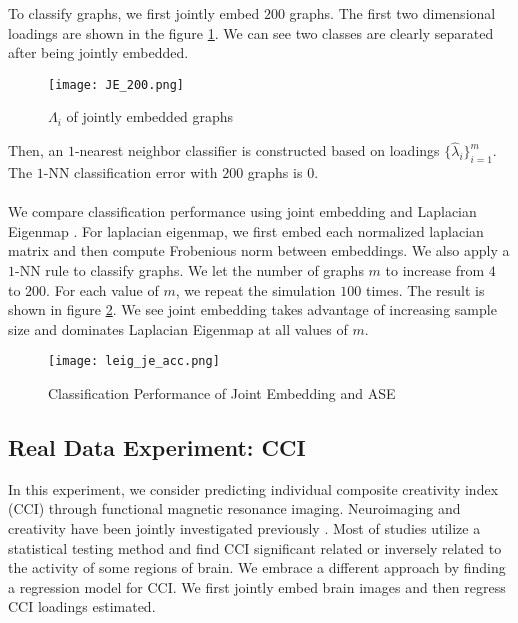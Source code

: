\documentclass[10pt,journal,compsoc]{IEEEtran}
\begin{document}
\noindent To classify graphs, we first jointly embed $200$ graphs. The first two dimensional loadings are shown in the figure \ref{fig:load}. We can see two classes are clearly separated after being jointly embedded.
\begin{figure}[!htbp]
	\centering
	\texttt{[image: JE\_200.png]}
	\caption{$\Lambda_i$ of jointly embedded graphs}
	\label{fig:load}
\end{figure}
Then, an $1$-nearest neighbor classifier is constructed based on loadings $\{\hat{\lambda}_i\}_{i=1}^m$. The $1$-NN classification error with $200$ graphs is $0$. \\
\\
\noindent We compare classification performance using joint embedding and Laplacian Eigenmap \cite{belkin2003laplacian}. For laplacian eigenmap, we first embed each normalized laplacian matrix and then compute Frobenious norm between embeddings. We also apply a $1$-NN rule to classify graphs. We let the number of graphs $m$ to increase from $4$ to $200$. For each value of $m$, we repeat the simulation $100$ times. The result is shown in figure \ref{fig:acc}. We see joint embedding takes advantage of increasing sample size and dominates Laplacian Eigenmap at all values of $m$. 
\begin{figure}[!htbp]
	\centering
	\texttt{[image: leig\_je\_acc.png]}
	\caption{Classification Performance of Joint Embedding and ASE}
	\label{fig:acc}
\end{figure} 




\subsection{Real Data Experiment: CCI}
In this experiment, we consider predicting individual composite creativity index (CCI) through functional magnetic resonance imaging. Neuroimaging and creativity have been jointly investigated previously \cite{arden2010neuroimaging}. Most of studies utilize a statistical testing method and find CCI significant related or inversely related to the activity of some regions of brain. We embrace a different approach by finding a regression model for CCI. We first jointly embed brain images and then regress CCI loadings estimated.
\end{document}
